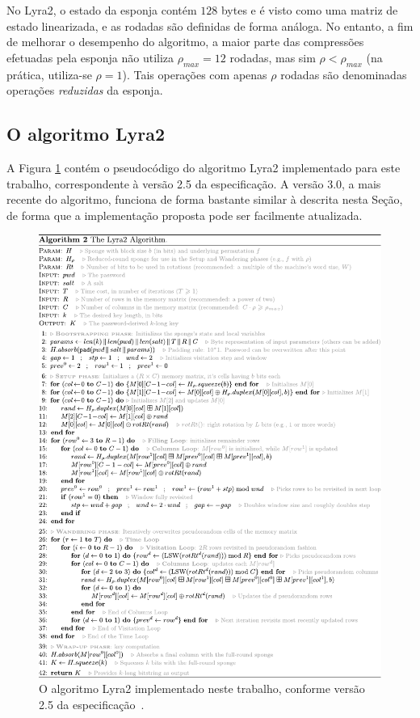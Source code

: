 \documentclass{article}
\begin{document}
No Lyra2, o estado da esponja contém $128$ bytes e é visto como uma matriz de
estado linearizada, e as rodadas são definidas de forma análoga. No entanto, a
fim de melhorar o desempenho do algoritmo, a maior parte das compressões
efetuadas pela esponja não utiliza $\rho_{max} = 12$ rodadas, mas sim $\rho <
\rho_{max}$ (na prática, utiliza-se $\rho = 1$). Tais operações com apenas
$\rho$ rodadas são denominadas operações \emph{reduzidas} da esponja.

\subsection{O algoritmo Lyra2 }\label{sec-lyra2-alg}

A Figura \ref{lyra2-alg} contém o pseudocódigo do algoritmo Lyra2 implementado
para este trabalho, correspondente à versão 2.5 da especificação. A versão 3.0,
a mais recente do algoritmo, funciona de forma bastante similar à descrita
nesta Seção, de forma que a implementação proposta pode ser facilmente
atualizada.

\begin{figure}[htbp]
\centering
\includegraphics[width=\linewidth]{./img/spec.pdf}
\caption{O algoritmo Lyra2 implementado neste trabalho\label{lyra2-alg}, conforme versão 2.5 da especificação~\cite{lyra2-spec}.}
\end{figure}
\end{document}
